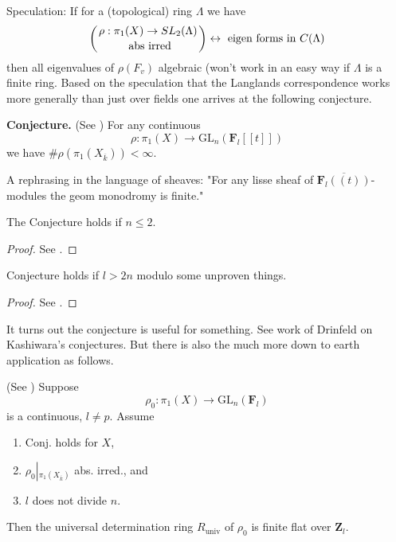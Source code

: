 \noindent
Speculation: If for a (topological) ring $\Lambda$ we have
$$
\left(
{\rho: \pi_1(X)\to SL_2(\Lambda)\atop \text{ abs irred}}
\right)
\leftrightarrow
\text{ eigen forms in } C(\Lambda)
$$
then all eigenvalues of $\rho(F_v)$ algebraic (won't work in an easy
way if $\Lambda$ is a finite ring. Based on the speculation that the
Langlands correspondence works more generally than just over fields
one arrives at the following conjecture.

\medskip\noindent
{\bf Conjecture.}
(See \cite{dJ-conjecture})
For any continuous
$$
\rho: \pi_1(X)\to \text{GL}_n(\mathbf{F}_l[[t]])
$$
we have $\# \rho(\pi_1(X_{\overline k}))<\infty$.

\medskip\noindent
A rephrasing in the language of sheaves:
"For any lisse sheaf of $\overline{\mathbf{F}_l((t))}$-modules the geom
monodromy is finite."

\begin{theorem}
\label{theorem-conjecture-n-2}
The Conjecture holds if $n\leq 2$.
\end{theorem}

\begin{proof}
See \cite{dJ-conjecture}.
\end{proof}

\begin{theorem}
\label{theorem-conjecture-l-bigger-2n}
Conjecture holds if $l>2n$ modulo some unproven things.
\end{theorem}

\begin{proof}
See \cite{Gaitsgory}.
\end{proof}

\noindent
It turns out the conjecture is useful for something.
See work of Drinfeld on Kashiwara's conjectures. But there is also
the much more down to earth application as follows.

\begin{theorem}
\label{theorem-deformation-rings}
(See \cite[Theorem 3.5]{dJ-conjecture})
Suppose
$$
\rho_0: \pi_1(X)\to \text{GL}_n(\mathbf{F}_l)
$$
is a continuous, $l\neq p$. Assume
\begin{enumerate}
\item Conj. holds for $X$,
\item $\rho_0\left|_{\pi_1(X_{\overline k})}\right.$ abs. irred., and
\item $l$ does not divide $n$.
\end{enumerate}
Then the universal determination ring $R_{\text{univ}}$ of $\rho_0$ is
finite flat over $\mathbf{Z}_l$.
\end{theorem}

